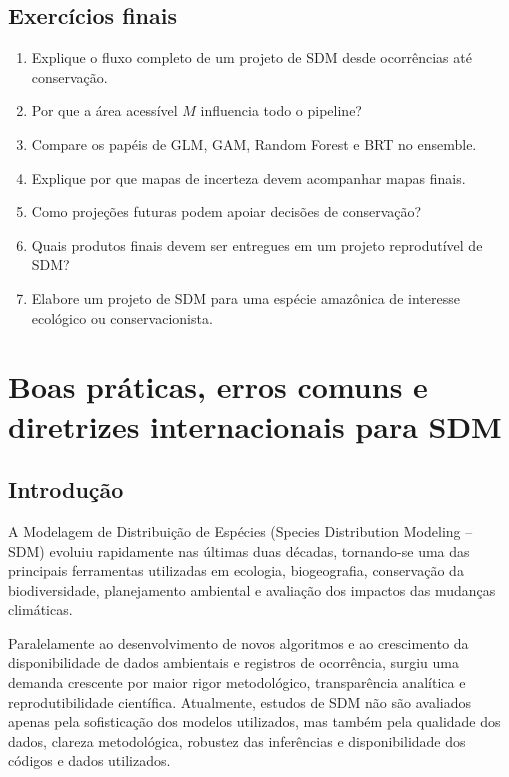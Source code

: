 \documentclass{ueap-sdm}
\begin{document}
\section{Exercícios finais}

\begin{enumerate}
	\item Explique o fluxo completo de um projeto de SDM desde ocorrências até conservação.
	\item Por que a área acessível \(M\) influencia todo o pipeline?
	\item Compare os papéis de GLM, GAM, Random Forest e BRT no ensemble.
	\item Explique por que mapas de incerteza devem acompanhar mapas finais.
	\item Como projeções futuras podem apoiar decisões de conservação?
	\item Quais produtos finais devem ser entregues em um projeto reprodutível de SDM?
	\item Elabore um projeto de SDM para uma espécie amazônica de interesse ecológico ou conservacionista.
\end{enumerate}


\chapter{Boas práticas, erros comuns e diretrizes internacionais para SDM}


\section{Introdução}

A Modelagem de Distribuição de Espécies (Species Distribution Modeling -- SDM)
evoluiu rapidamente nas últimas duas décadas, tornando-se uma das principais
ferramentas utilizadas em ecologia, biogeografia, conservação da biodiversidade,
planejamento ambiental e avaliação dos impactos das mudanças climáticas.

Paralelamente ao desenvolvimento de novos algoritmos e ao crescimento da
disponibilidade de dados ambientais e registros de ocorrência, surgiu uma
demanda crescente por maior rigor metodológico, transparência analítica e
reprodutibilidade científica. Atualmente, estudos de SDM não são avaliados
apenas pela sofisticação dos modelos utilizados, mas também pela qualidade dos
dados, clareza metodológica, robustez das inferências e disponibilidade dos
códigos e dados utilizados.
\end{document}

